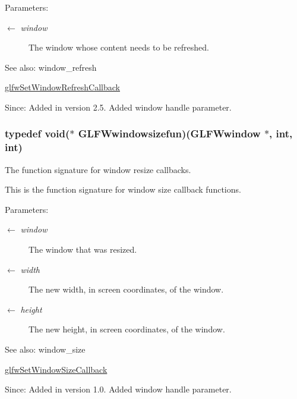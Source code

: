 \begin{Desc}
\item[Parameters:]
\begin{description}
\item[\mbox{$\leftarrow$} {\em window}]The window whose content needs to be refreshed.\end{description}
\end{Desc}
\begin{Desc}
\item[See also:]window\_\-refresh 

\hyperlink{group__window_g9d2621fbc271a0cdc0ce91f9749f46e3}{glfwSetWindowRefreshCallback}\end{Desc}
\begin{Desc}
\item[Since:]Added in version 2.5.  Added window handle parameter. \end{Desc}
\hypertarget{group__window_gaca1c2715759d03da9834eac19323d4a}{
\subsubsection[GLFWwindowsizefun]{\setlength{\rightskip}{0pt plus 5cm}typedef void($\ast$  {\bf GLFWwindowsizefun})({\bf GLFWwindow} $\ast$, int, int)}}
\label{group__window_gaca1c2715759d03da9834eac19323d4a}


The function signature for window resize callbacks. 

This is the function signature for window size callback functions.

\begin{Desc}
\item[Parameters:]
\begin{description}
\item[\mbox{$\leftarrow$} {\em window}]The window that was resized. \item[\mbox{$\leftarrow$} {\em width}]The new width, in screen coordinates, of the window. \item[\mbox{$\leftarrow$} {\em height}]The new height, in screen coordinates, of the window.\end{description}
\end{Desc}
\begin{Desc}
\item[See also:]window\_\-size 

\hyperlink{group__window_g150dad5f364425916c5816074cffa5e7}{glfwSetWindowSizeCallback}\end{Desc}
\begin{Desc}
\item[Since:]Added in version 1.0.  Added window handle parameter. \end{Desc}


